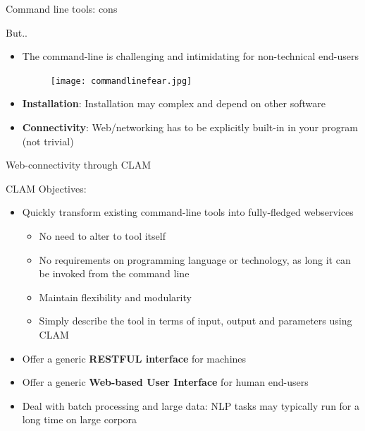 \documentclass[xcolor=table,10pt,t]{beamer}
\begin{document}
\begin{frame}{Command line tools: cons}
  \begin{block}{But..}
      \begin{itemize}
        \item The command-line is challenging and intimidating for non-technical end-users
        \begin{figure}
            \texttt{[image: commandlinefear.jpg]}
        \end{figure}
        \item<2-> \textbf{Installation}: Installation may complex and depend on other software
        \item<2-> \textbf{Connectivity}: Web/networking has to be explicitly built-in in your program (not trivial)
      \end{itemize}
  \end{block}
\end{frame}

\begin{frame}{Web-connectivity through CLAM}
  \begin{block}{CLAM}
      Objectives:
      \begin{itemize}
        \item Quickly transform existing command-line tools into fully-fledged webservices 
        \begin{itemize}
            \item No need to alter to tool itself
            \item No requirements on programming language or technology, as
                long it can be invoked from the command line
            \item Maintain flexibility and modularity
            \item Simply describe the tool in terms of input, output and
                parameters using CLAM
        \end{itemize}
        \item Offer a generic \textbf{RESTFUL interface} for machines
        \item Offer a generic \textbf{Web-based User Interface} for human end-users
        \item Deal with batch processing and large data: NLP tasks may typically run for a
            long time on large corpora
      \end{itemize}
  \end{block}
\end{frame}
\end{document}

